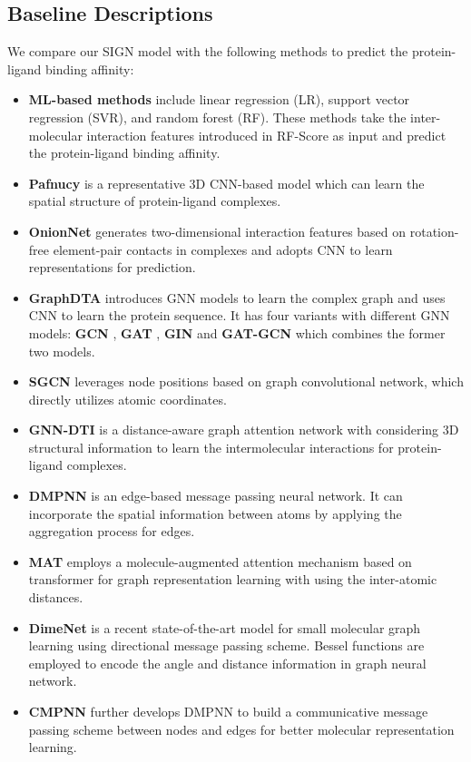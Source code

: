 \documentclass[sigconf]{acmart}
\newcommand{\B}[1]{{\bfseries #1}}
\newcommand{\model}{\textsf{SIGN}\xspace}
\begin{document}
\subsection{Baseline Descriptions}
We compare our \model model with the following methods to predict the protein-ligand binding affinity:
\label{a-baseline}
\begin{itemize}[leftmargin=*,topsep=3pt]
    \item \B{ML-based methods} include linear regression (LR), support vector regression (SVR), and random forest (RF). These methods take the inter-molecular interaction features introduced in RF-Score \cite{ballester2010machine} as input and predict the protein-ligand binding affinity.
    \item \B{Pafnucy} \cite{stepniewska2018development} is a representative 3D CNN-based model which can learn the spatial structure of protein-ligand complexes.
    \item \B{OnionNet} \cite{zheng2019onionnet} generates two-dimensional interaction features based on rotation-free element-pair contacts in complexes and adopts CNN to learn representations for prediction.
    \item \B{GraphDTA} \cite{10.1093/bioinformatics/btaa921} introduces GNN models to learn the complex graph and uses CNN to learn the protein sequence. It has four variants with different GNN models: \B{GCN} \cite{kipf2017semi}, \B{GAT} \cite{velivckovic2018graph}, \B{GIN} \cite{xu2018powerful} and \B{GAT-GCN} which combines the former two models.
    \item \B{SGCN} \cite{danel2020spatial} leverages node positions based on graph convolutional network, which directly utilizes atomic coordinates.
    \item \B{GNN-DTI} \cite{lim2019predicting} is a distance-aware graph attention network with considering 3D structural information to learn the intermolecular interactions for protein-ligand complexes.
    \item \B{DMPNN} \cite{yang2019analyzing} is an edge-based message passing neural network. It can incorporate the spatial information between atoms by applying the aggregation process for edges.
    \item \B{MAT} \cite{maziarka2020molecule} employs a molecule-augmented attention mechanism based on transformer for graph representation learning with using the inter-atomic distances.
    \item \B{DimeNet} \cite{klicpera_dimenet_2020} is a recent state-of-the-art model for small molecular graph learning using directional message passing scheme. Bessel functions are employed to encode the angle and distance information in graph neural network. 
    \item \B{CMPNN} \cite{song2020communicative} further develops DMPNN to build a communicative message passing scheme between nodes and edges for better molecular representation learning.
\end{itemize}
\vspace{-2mm}
\end{document}
